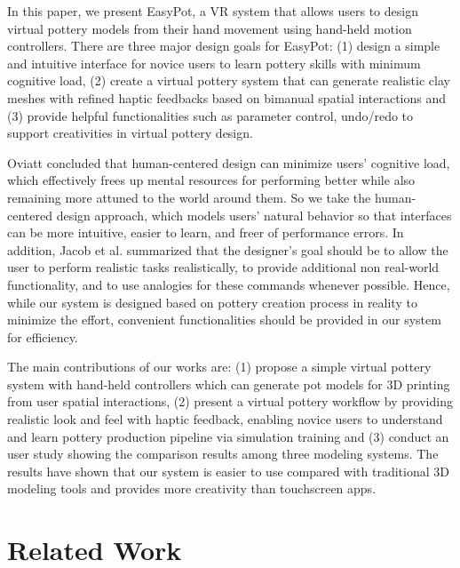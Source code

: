 \documentclass{svjour3}                     %
\begin{document}
In this paper, we present EasyPot, a VR system that allows users to design virtual pottery models from their hand movement using hand-held motion controllers. There are three major design goals for EasyPot:
(1) design a simple and intuitive interface for novice users to learn pottery skills with minimum cognitive load,
(2) create a virtual pottery system that can generate realistic clay meshes with refined haptic feedbacks based on bimanual spatial interactions 
and (3) provide helpful functionalities such as parameter control, undo/redo to support creativities in virtual pottery design.

Oviatt \cite{oviatt2006human} concluded that human-centered design can minimize users’ cognitive load, which effectively frees up mental resources for performing better while also remaining more attuned to the world around them.
So we take the human-centered design approach, which models users’ natural behavior so that interfaces can be more intuitive, easier to learn, and freer of performance errors.
In addition, Jacob et al. \cite{Jacob2008Reality} summarized that the designer's goal should be to allow the user to perform realistic tasks realistically, to provide additional non real-world functionality, and to use analogies for these commands whenever possible.
Hence, while our system is designed based on pottery creation process in reality to minimize the effort, convenient functionalities should be provided in our system for efficiency.

The main contributions of our works are:
%
(1) propose a simple virtual pottery system with hand-held controllers which can generate pot models for 3D printing from user spatial interactions,
%
(2) present a virtual pottery workflow by providing realistic look and feel with haptic feedback, enabling novice users to understand and learn pottery production pipeline via simulation training 
%
and (3) conduct an user study showing the comparison results among three modeling systems. The results have shown that our system is easier to use compared with traditional 3D modeling tools and provides more creativity than touchscreen apps.


\section{Related Work}
\label{sec:2}
\end{document}
